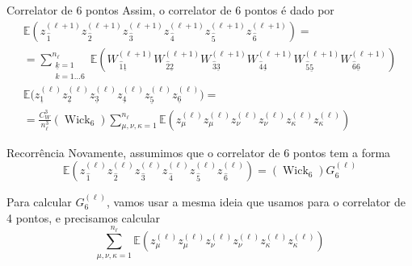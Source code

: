 \documentclass{beamer}
\newcommand{\EE}{\mathbb{E}}
\DeclareMathOperator{\Wick}{Wick}
\def\mi#1{{\,\widehat{#1}}}
\def\mj#1{\underline{#1}}
\def\eell{{(\ell)}}
\def\eellum{{(\ell+1)}}
\begin{document}
\begin{frame}{Correlator de 6 pontos}
	Assim, o correlator de 6 pontos é dado por
	\small
	\begin{multline*}\tag{3.36}
		\EE\left(z_{\mi1}^\eellum z_{\mi2}^\eellum z_{\mi3}^\eellum z_{\mi4}^\eellum z_{\mi5}^\eellum z_{\mi6}^\eellum\right) =  \\
				= \sum_{\substack{\mj{k}=1\\k=1\ldots 6}}^{n_\ell} \EE\left( W_{\mi1 \mj1}^\eellum W_{\mi2 \mj2}^\eellum W_{\mi3 \mj3}^\eellum W_{\mi4 \mj4}^\eellum W_{\mi5 \mj5}^\eellum W_{\mi6 \mj6}^\eellum \right)\\\EE\big(z_{\mj1}^\eell z_{\mj2}^\eell z_{\mj3}^\eell z_{\mj4}^\eell z_{\mj5}^\eell z_{\mj6}^\eell\big) = \\
				= \frac{C_W^3}{n_\ell^3}(\Wick_6)\sum_{\mu,\nu,\kappa=1}^{n_\ell} \EE\left(z_{\mu}^\eell z_{\mu}^\eell z_{\nu}^\eell z_{\nu}^\eell z_{\kappa}^\eell z_{\kappa}^\eell\right) 
	\end{multline*} 
\end{frame}

\begin{frame}{Recorrência}
	Novamente, assumimos que o correlator de 6 pontos tem a forma
	\begin{equation*}\tag{3.37}
		\EE\left(z_{\mi1}^\eell z_{\mi2}^\eell z_{\mi3}^\eell z_{\mi4}^\eell z_{\mi5}^\eell z_{\mi6}^\eell\right) = \left(\Wick_6 \right)G_6^\eell
	\end{equation*}

	Para calcular $G_6^\eell$, vamos usar a mesma ideia que usamos para o correlator de 4 pontos, e precisamos calcular 
	$$\sum_{\mu,\nu,\kappa=1}^{n_\ell} \EE\left(z_{\mu}^\eell z_{\mu}^\eell z_{\nu}^\eell z_{\nu}^\eell z_{\kappa}^\eell z_{\kappa}^\eell\right) $$
\end{frame}
\end{document}
